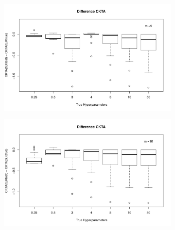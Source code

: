 \documentclass[11pt, a4paper]{article} %
\begin{document}
\begin{landscape}
\begin{figure}
\begin{subfigure}{\textwidth}
  \centering
  \includegraphics[width=.8\linewidth]{dif_ckta_m_9.pdf}
  \label{fig:sfig1}
\end{subfigure}%
\begin{subfigure}{\textwidth}
  \centering
  \includegraphics[width=.8\linewidth]{dif_ckta_m_10.pdf}
  \label{fig:sfig2}
\end{subfigure}
\label{fig1}
\end{figure}

\end{landscape}

\restoregeometry
\end{document}
